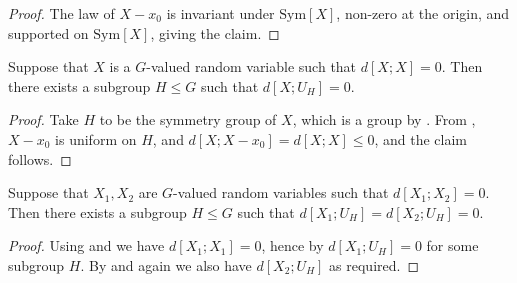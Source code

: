 \begin{proof}\leanok  The law of $X-x_0$ is invariant under $\mathrm{Sym}[X]$, non-zero at the origin, and supported on  $\mathrm{Sym}[X]$, giving the claim.
\end{proof}


\begin{lemma}\label{lem:100pc-self}
  \leanok
  Suppose that $X$ is a $G$-valued random variable such that
  $d[X ;X]=0$. Then there exists a subgroup $H \leq G$ such that $d[X ;U_H] = 0$.
\end{lemma}

\begin{proof}\leanok
Take $H$ to be the symmetry group of $X$, which is a group by . From , $X-x_0$ is uniform on $H$, and $d[X ;X-x_0] = d[X ;X] \leq 0$, and the claim follows.
\end{proof}

\begin{corollary}\label{lem:100pc}
  \leanok
  Suppose that $X_1,X_2$ are $G$-valued random variables such that
  $d[X_1;X_2]=0$. Then there exists a subgroup $H \leq G$ such that $d[X_1;U_H] = d[X_2;U_H] = 0$.
\end{corollary}

\begin{proof}\leanok
Using  and  we have $d[X_1;X_1]=0$, hence by  $d[X_1;U_H]=0$ for some subgroup $H$.  By  and  again we also have $d[X_2;U_H]$ as required.
\end{proof}
